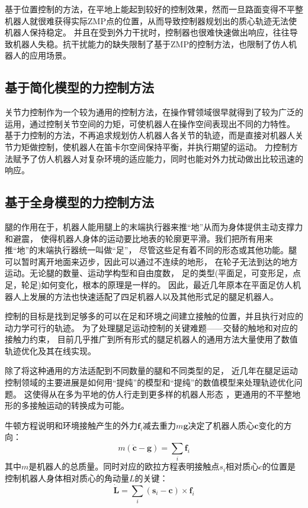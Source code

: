 基于位置控制的方法，在平地上能起到较好的控制效果，然而一旦路面变得不平整机器人就很难获得实际ZMP点的位置，从而导致控制器规划出的质心轨迹无法使机器人保持稳定。
并且在受到外力干扰时，控制器也很难快速做出响应，往往导致机器人失稳。抗干扰能力的缺失限制了基于ZMP的控制方法，也限制了仿人机器人的应用场景。

\subsection{基于简化模型的力控制方法}
关节力控制作为一个较为通用的控制方法，在操作臂领域很早就得到了较为广泛的运用，通过控制关节空间的力矩，可使机器人在操作空间表现出不同的力特性。
基于力控制的方法，不再追求规划仿人机器人各关节的轨迹，而是直接对机器人关节力矩做控制，使机器人在笛卡尔空间保持平衡，并执行期望的运动。
力控制方法赋予了仿人机器人对复杂环境的适应能力，同时也能对外力扰动做出比较迅速的响应。
\subsection{基于全身模型的力控制方法}

腿的作用在于，机器人能用腿上的末端执行器来推“地”从而为身体提供主动支撑力和避震，
使得机器人身体的运动要比地表的轮廓更平滑。我们把所有用来推“地”的末端执行器统一叫做“足”，
尽管这些足有着不同的形态或其他功能。腿可以暂时离开地面来迈步，因此可以通过不连续的地形，
在轮子无法到达的地方运动。无论腿的数量、运动学构型和自由度数，
足的类型(平面足，可变形足，点足，轮足)如何变化，根本的原理是一样的。
因此，最近几年原本在平面足仿人机器人上发展的方法也快速适配了四足机器人以及其他形式足的腿足机器人。

控制的目标是找到足够多的可以在足和环境之间建立接触的位置，并且执行对应的动力学可行的轨迹。
为了处理腿足运动控制的关键难题——交替的触地和对应的接触力约束，
目前几乎推广到所有形式的腿足机器人的通用方法大量使用了数值轨迹优化及其在线实现。

除了将这种通用的方法适配到不同数量的腿和不同类型的足，
近几年在腿足运动控制领域的主要进展是如何用“提纯”的模型和“提纯”的数值模型来处理轨迹优化问题。
这使得从在多为平地的仿人行走到更多样的机器人形态
，更通用的不平整地形的多接触运动的转换成为可能。

牛顿方程说明和环境接触产生的外力$\boldsymbol{f}_i$减去重力$m\boldsymbol{g}$决定了机器人质心$\boldsymbol{c}$变化的方向：
\begin{equation}
    \label{equ:newton}
    m(\ddot{\boldsymbol{c}}-\boldsymbol{g})=\sum_i \boldsymbol{f}_i
\end{equation}
其中$m$是机器人的总质量。同时对应的欧拉方程表明接触点$s_i$相对质心$c$的位置是控制机器人身体相对质心的角动量$L$的关键：
\begin{equation}
    \label{equ:euler}
    \dot{\boldsymbol{L}}=\sum_i\left(\boldsymbol{s}_i-\boldsymbol{c}\right) \times \boldsymbol{f}_i
\end{equation}

